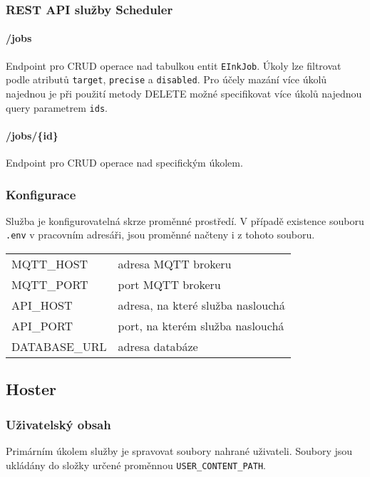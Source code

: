 \subsubsection{REST API služby Scheduler}
\paragraph*{/jobs} Endpoint pro CRUD operace nad tabulkou entit \lstinline{EInkJob}. Úkoly lze filtrovat podle atributů \lstinline{target}, \lstinline{precise} a \lstinline{disabled}. Pro účely mazání více úkolů najednou je při použití metody DELETE možné specifikovat více úkolů najednou query parametrem \lstinline{ids}.
\paragraph*{/jobs/\{id\}} Endpoint pro CRUD operace nad specifickým úkolem.

\subsubsection{Konfigurace}
Služba je konfigurovatelná skrze proměnné prostředí. V případě existence souboru \lstinline|.env| v pracovním adresáři, jsou proměnné načteny i z tohoto souboru.

\begin{table}[h]
    \begin{tabular}{ll}
        MQTT\_HOST & adresa MQTT brokeru \\
        MQTT\_PORT & port MQTT brokeru \\
        API\_HOST & adresa, na které služba naslouchá \\
        API\_PORT & port, na kterém služba naslouchá \\
        DATABASE\_URL & adresa databáze \\
    \end{tabular}
\end{table}

\subsection{Hoster}
\subsubsection{Uživatelský obsah}
Primárním úkolem služby je spravovat soubory nahrané uživateli. Soubory jsou ukládány do složky určené proměnnou \lstinline{USER_CONTENT_PATH}.

